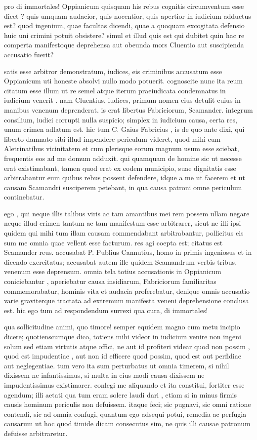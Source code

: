  pro di immortales! Oppianicum quisquam his rebus cognitis circumventum esse dicet ? quis umquam audacior, quis nocentior, quis apertior in iudicium adductus est? quod ingenium, quae facultas dicendi, quae a quoquam excogitata defensio huic uni crimini potuit obsistere? simul et illud quis est qui dubitet quin hac re comperta manifestoque deprehensa aut obeunda mors Cluentio aut suscipienda accusatio fuerit?

 satis esse arbitror demonstratum, iudices, eis criminibus accusatum esse Oppianicum uti honeste absolvi nullo modo potuerit. cognoscite nunc ita reum citatum esse illum ut re semel atque iterum praeiudicata condemnatus in iudicium venerit . nam Cluentius, iudices, primum nomen eius detulit cuius in manibus venenum deprenderat. is erat libertus Fabriciorum, Scamander. integrum consilium, iudici corrupti nulla suspicio; simplex in iudicium causa, certa res, unum crimen adlatum est. hic tum C. Gaius Fabricius , is de quo ante dixi, qui liberto damnato sibi illud impendere periculum videret, quod mihi cum Aletrinatibus vicinitatem et cum plerisque eorum magnum usum esse sciebat, frequentis eos ad me domum adduxit. qui quamquam de homine sic ut necesse erat existimabant, tamen quod erat ex eodem municipio, suae dignitatis esse arbitrabantur eum quibus rebus possent defendere, idque a me ut facerem et ut causam Scamandri susciperem petebant, in qua causa patroni omne periculum continebatur.

 ego , qui neque illis talibus viris ac tam amantibus mei rem possem ullam negare neque illud crimen tantum ac tam manifestum esse arbitrarer, sicut ne illi ipsi quidem qui mihi tum illam causam commendabant arbitrabantur, pollicitus eis sum me omnia quae vellent esse facturum. res agi coepta est; citatus est Scamander reus. accusabat P. Publius Cannutius, homo in primis ingeniosus et in dicendo exercitatus; accusabat autem ille quidem Scamandrum verbis tribus, venenum esse deprensum. omnia tela totius accusationis in Oppianicum coniciebantur , aperiebatur causa insidiarum, Fabriciorum familiaritas commemorabatur, hominis vita et audacia proferebatur, denique omnis accusatio varie graviterque tractata ad extremum manifesta veneni deprehensione conclusa est. hic ego tum ad respondendum surrexi qua cura, di immortales!

 qua sollicitudine animi, quo timore! semper equidem magno cum metu incipio dicere; quotienscumque dico, totiens mihi videor in iudicium venire non ingeni solum sed etiam virtutis atque offici, ne aut id profiteri videar quod non possim , quod est impudentiae , aut non id efficere quod possim, quod est aut perfidiae aut neglegentiae. tum vero ita sum perturbatus ut omnia timerem, si nihil dixissem ne infantissimus, si multa in eius modi causa dixissem ne impudentissimus existimarer. conlegi me aliquando et ita constitui, fortiter esse agendum; illi aetati qua tum eram solere laudi dari , etiam si in minus firmis causis hominum periculis non defuissem. itaque feci; sic pugnavi, sic omni ratione contendi, sic ad omnia confugi, quantum ego adsequi potui, remedia ac perfugia causarum ut hoc quod timide dicam consecutus sim, ne quis illi causae patronum defuisse arbitraretur.

